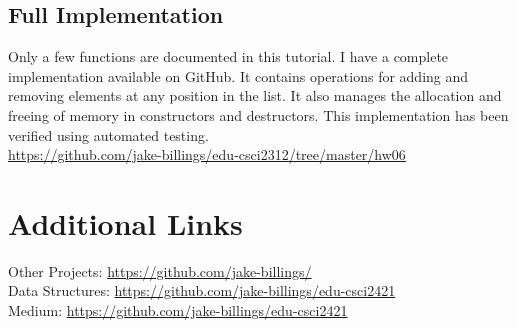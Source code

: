 \documentclass[12pt]{article}
\begin{document}
\newpage

\subsection{Full Implementation}
Only a few functions are documented in this tutorial. I have a complete implementation available on GitHub. It contains operations for adding and removing elements at any position in the list. It also manages the allocation and freeing of memory in constructors and destructors. This implementation has been verified using automated testing.\\

\href{https://github.com/jake-billings/edu-csci2312/tree/master/hw06}{https://github.com/jake-billings/edu-csci2312/tree/master/hw06}

\newpage

\section{Additional Links}

\noindent
Other Projects: 
\href{https://github.com/jake-billings/}{https://github.com/jake-billings/}\\

\noindent
Data Structures: \href{https://github.com/jake-billings/edu-csci2421}{https://github.com/jake-billings/edu-csci2421}\\

\noindent
Medium: \href{https://github.com/jake-billings/edu-csci2421}{https://github.com/jake-billings/edu-csci2421}
\end{document}
